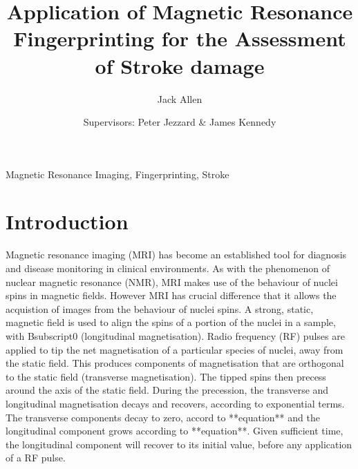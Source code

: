 \documentclass[review]{elsarticle}
\begin{document}
\begin{frontmatter}

\title{Application of Magnetic Resonance Fingerprinting for the Assessment of Stroke damage}

\author{Jack Allen}
\author{Supervisors: Peter Jezzard \& James Kennedy}
\address{University of Oxford, Oxford, UK.}





\begin{abstract}

\end{abstract}


\begin{keyword}
Magnetic Resonance Imaging, Fingerprinting, Stroke
\end{keyword}

\end{frontmatter}


\section{Introduction}

Magnetic resonance imaging (MRI) has become an established tool for diagnosis and disease monitoring in clinical environments. As with the phenomenon of nuclear magnetic resonance (NMR), MRI makes use of the behaviour of nuclei spins in magnetic fields. However MRI has crucial difference that it allows the acquistion of images from the behaviour of nuclei spins.  A strong, static, magnetic field is used to align the spins of a portion of the nuclei in a sample, with Bsubscript0 (longitudinal magnetisation). Radio frequency (RF) pulses are applied to tip the net magnetisation of a particular species of nuclei, away from the static field. This produces components of magnetisation that are orthogonal to the static field (transverse magnetisation). The tipped spins then precess around the axis of the static field. During the precession, the transverse and longitudinal magnetisation decays and recovers, according to exponential terms. The transverse components decay to zero, accord to **equation** and the longitudinal component grows according to **equation**. Given sufficient time, the longitudinal component will recover to its initial value, before any application of a RF pulse. 
\end{document}
